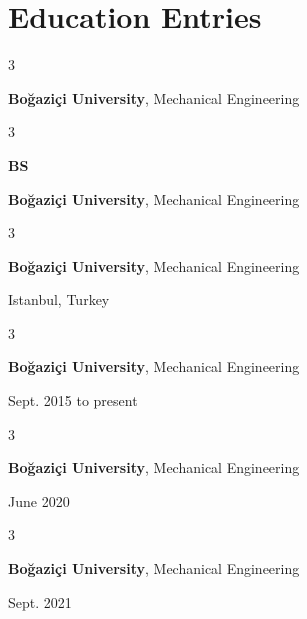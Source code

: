 \documentclass[10pt, letterpaper]{article}
\newenvironment{threecolentry}[3][]{
    \onecolentry
    \def\thirdColumn{#3}
    \setcolumnwidth{1cm, \fill, 4.1 cm}
    \begin{paracol}{3}
    \raggedright #2 \switchcolumn
}{
    \switchcolumn \raggedleft \thirdColumn
    \end{paracol}
    \endonecolentry
} %
\begin{document}
    
    \section{Education Entries}

        
        \begin{threecolentry}{\textbf{}}{
            
        }
            \textbf{Boğaziçi University}, Mechanical Engineering
        \end{threecolentry}

        \vspace{0.2 cm}

        \begin{threecolentry}{\textbf{BS}}{
            
        }
            \textbf{Boğaziçi University}, Mechanical Engineering
        \end{threecolentry}

        \vspace{0.2 cm}

        \begin{threecolentry}{\textbf{}}{
            Istanbul, Turkey
        }
            \textbf{Boğaziçi University}, Mechanical Engineering
        \end{threecolentry}

        \vspace{0.2 cm}

        \begin{threecolentry}{\textbf{}}{
            Sept. 2015 to present
        }
            \textbf{Boğaziçi University}, Mechanical Engineering
        \end{threecolentry}

        \vspace{0.2 cm}

        \begin{threecolentry}{\textbf{}}{
            June 2020
        }
            \textbf{Boğaziçi University}, Mechanical Engineering
        \end{threecolentry}

        \vspace{0.2 cm}

        \begin{threecolentry}{\textbf{}}{
            Sept. 2021
        }
            \textbf{Boğaziçi University}, Mechanical Engineering
        \end{threecolentry}

        \vspace{0.2 cm}
\end{document}
